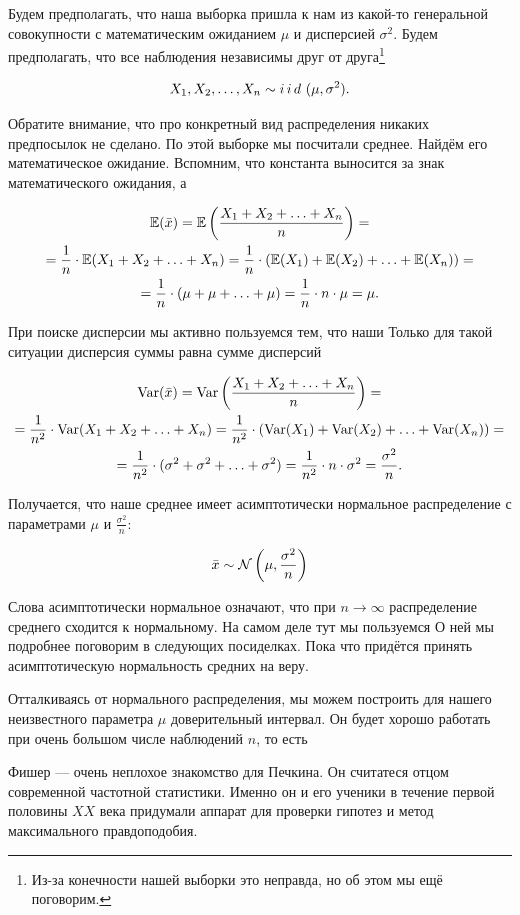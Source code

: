 \documentclass[12pt, a4paper, oneside]{article}
\begin{document}
\begin{sol} 
Будем предполагать, что наша выборка пришла к нам из какой-то генеральной совокупности с математическим ожиданием $\mu$ и дисперсией $\sigma^2$. Будем предполагать, что все наблюдения независимы друг от друга\footnote{Из-за конечности нашей выборки это неправда, но об этом мы ещё поговорим.}

\[
X_1, X_2, \ldots, X_n \sim i\,i\,d\,\, (\mu, \sigma^2).
\]

Обратите внимание, что про конкретный вид распределения никаких предпосылок не сделано. По этой выборке мы посчитали среднее. Найдём его математическое ожидание. Вспомним, что константа выносится за знак математического ожидания, а 

\begin{multline*}
\mathbb{E}(\bar{x}) = \mathbb{E} \left(\frac{X_1 + X_2 + \ldots + X_n}{n}\right) = \\ = \frac{1}{n} \cdot \mathbb{E}(X_1 + X_2 + \ldots + X_n) = \frac{1}{n} \cdot (\mathbb{E}(X_1) + \mathbb{E}(X_2) + \ldots + \mathbb{E}(X_n))  = \\ = \frac{1}{n} \cdot (\mu + \mu + \ldots + \mu) = \frac{1}{n} \cdot n \cdot \mu = \mu.
\end{multline*}

При поиске дисперсии мы активно пользуемся тем, что наши  Только для такой ситуации дисперсия суммы равна сумме дисперсий

\begin{multline*}
\operatorname{Var}(\bar{x}) = \operatorname{Var} \left(\frac{X_1 + X_2 + \ldots + X_n}{n}\right) = \\ = \frac{1}{n^2} \cdot \operatorname{Var}(X_1 + X_2 + \ldots + X_n) = \frac{1}{n^2} \cdot (\operatorname{Var}(X_1) + \operatorname{Var}(X_2) + \ldots + \operatorname{Var}(X_n))  = \\ = \frac{1}{n^2} \cdot (\sigma^2 + \sigma^2 + \ldots + \sigma^2) = \frac{1}{n^2} \cdot n \cdot \sigma^2 = \frac{\sigma^2}{n}.
\end{multline*}


Получается, что наше среднее имеет асимптотически нормальное распределение с параметрами $\mu$ и $\frac{\sigma^2}{n}$:

$$
\bar{x} \sim \mathcal{N} \left(\mu, \frac{\sigma^2}{n} \right)
$$

Слова асимптотически нормальное означают, что при $n \to \infty$ распределение среднего сходится к нормальному. На самом деле тут мы пользуемся  О ней мы подробнее поговорим в следующих посиделках. Пока что придётся принять асимптотическую нормальность средних на веру.  

Отталкиваясь от нормального распределения, мы можем построить для нашего неизвестного параметра $\mu$ доверительный интервал. Он будет хорошо работать при очень большом числе наблюдений $n$, то есть 

Фишер --- очень неплохое знакомство для Печкина. Он считатеся отцом современной частотной статистики. Именно он и его ученики в течение первой половины $XX$ века придумали аппарат для проверки гипотез и метод максимального правдоподобия.
\end{sol} 
\end{document}

